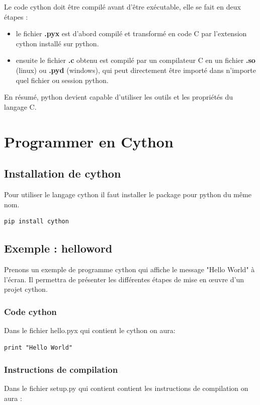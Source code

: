 Le code cython doit être compilé avant d'être exécutable, elle se fait en deux étapes : 
\begin{itemize}
\item le fichier \textbf{.pyx} est d'abord compilé et transformé en code C par l'extension cython installé sur python.
\item ensuite le fichier \textbf{.c} obtenu est compilé par un compilateur C en un fichier \textbf{.so} (linux) ou \textbf{.pyd} (windows), qui peut directement être importé dans n'importe quel fichier ou session python.
\end{itemize}

En résumé, python devient capable d'utiliser les outils et les propriétés du langage C. 

\section{Programmer en Cython}

\subsection{Installation de cython}

Pour utiliser le langage cython il faut installer le package pour python du même nom.

\begin{verbatim}
pip install cython
\end{verbatim}

\subsection{Exemple : helloword}

Prenons un exemple de programme cython qui affiche le message "Hello World" à l'écran. Il permettra de présenter les différentes étapes de mise en œuvre d'un projet cython.

\subsubsection{Code cython}
Dans le fichier hello.pyx qui contient le cython on aura:
\begin{verbatim}
print "Hello World"
\end{verbatim}


\subsubsection{Instructions de compilation}
Dans le fichier setup.py qui contient contient les instructions de compilation on aura :

